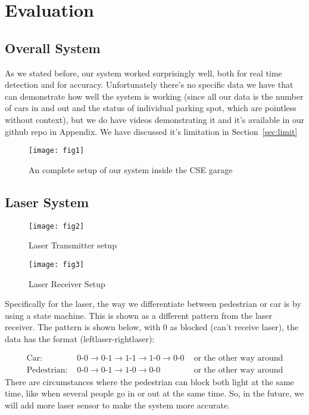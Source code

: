 \documentclass[12pt, a4paper]{article}
\begin{document}
\section{Evaluation}
\subsection{Overall System}
As we stated before, our system worked surprisingly well, both for real time detection and for accuracy. Unfortunately there's no specific data we have that can demonstrate how well the system is working (since all our data is the number of cars in and out and the status of individual parking spot, which are pointless without context), but we do have videos demonstrating it and it's available in our github repo in Appendix. We have discussed it's limitation in Section~\ref{sec:limit}
\begin{figure}[H]
	\centering
	\texttt{[image: fig1]}
	\caption{An complete setup of our system inside the CSE garage}
\end{figure}
\subsection{Laser System}
\begin{figure}[H]
	\centering
	\texttt{[image: fig2]}
	\caption{Laser Transmitter setup}
\end{figure}
\begin{figure}[H]
	\centering
	\texttt{[image: fig3]}
	\caption{Laser Receiver Setup}
\end{figure}
Specifically for the laser, the way we differentiate between pedestrian or car is by using a state machine. This is shown as a different pattern from the laser receiver. The pattern is shown below, with 0 as blocked (can't receive laser), the data has the format (leftlaser-rightlaser):

\begin{align*}
	\text{Car: }&\text{0-0}\rightarrow\text{0-1}\rightarrow\text{1-1}\rightarrow\text{1-0}\rightarrow\text{0-0}&\text{ or the other way around}\\ 
	\text{Pedestrian: }&\text{0-0}\rightarrow\text{0-1}\rightarrow\text{1-0}\rightarrow\text{0-0}&\text{ or the other way around}
\end{align*}
There are circumstances where the pedestrian can block both light at the same time, like when several people go in or out at the same time.
So, in the future, we will add more laser sensor to make the system more accurate.
\end{document}
